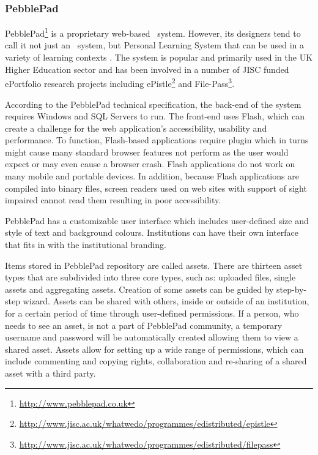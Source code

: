 \subsubsection{PebblePad}

PebblePad\footnote{\url{http://www.pebblepad.co.uk}} is a proprietary web-based
\ep~system. However, its designers tend to call it not just an \ep~system, but
Personal Learning System that can be used in a variety of learning contexts
\citep{PebbleLearningLtd2010}. The system is popular and primarily used in the
UK Higher Education sector and has been involved in a number of JISC funded
ePortfolio research projects including
ePistle\footnote{\url{http://www.jisc.ac.uk/whatwedo/programmes/edistributed/epistle}}
and File-Pass\footnote{\url{http://www.jisc.ac.uk/whatwedo/programmes/edistributed/filepass}}.

According to the PebblePad technical specification, the back-end of the system
requires Windows and SQL Servers to run. The front-end uses Flash, which can
create a challenge for the web application's accessibility, usability and
performance. To function, Flash-based applications require plugin which in turns
might cause many standard browser features not perform as the user would expect
or may even cause a browser crash. Flash applications do not work on many mobile
and portable devices. In addition, because Flash applications are compiled into
binary files, screen readers used on web sites with support of sight impaired
cannot read them resulting in poor accessibility.

PebblePad has a customizable user interface which includes user-defined size and
style of text and background colours. Institutions can have their own interface
that fits in with the institutional branding.

Items stored in PebblePad repository are called assets. There are thirteen asset
types that are subdivided into three core types, such as: uploaded files, single
assets and aggregating assets. Creation of some assets can be guided by
step-by-step wizard. Assets can be shared with others, inside or outside of an
institution, for a certain period of time through user-defined permissions. If a
person, who needs to see an asset, is not a part of PebblePad community, a
temporary username and password will be automatically created allowing them to
view a shared asset. Assets allow for setting up a wide range of permissions,
which can include commenting and copying rights, collaboration and re-sharing
of a shared asset with a third party.

